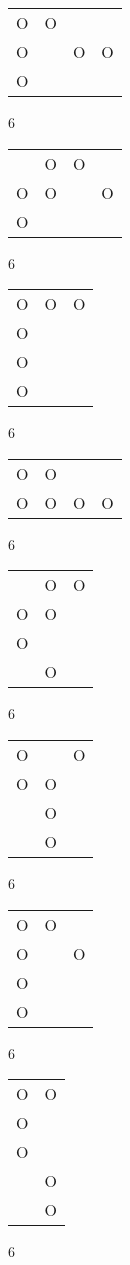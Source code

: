 \begin{tabular}{|m{0.2cm}m{0.2cm}m{0.2cm}m{0.2cm}|}\hline
O&O& & \\
O& &O&O\\
O& & & \\
\hline\end{tabular}6
\begin{tabular}{|m{0.2cm}m{0.2cm}m{0.2cm}m{0.2cm}|}\hline
 &O&O& \\
O&O& &O\\
O& & & \\
\hline\end{tabular}6
\begin{tabular}{|m{0.2cm}m{0.2cm}m{0.2cm}|}\hline
O&O&O\\
O& & \\
O& & \\
O& & \\
\hline\end{tabular}6
\begin{tabular}{|m{0.2cm}m{0.2cm}m{0.2cm}m{0.2cm}|}\hline
O&O& & \\
O&O&O&O\\
\hline\end{tabular}6
\begin{tabular}{|m{0.2cm}m{0.2cm}m{0.2cm}|}\hline
 &O&O\\
O&O& \\
O& & \\
 &O& \\
\hline\end{tabular}6
\begin{tabular}{|m{0.2cm}m{0.2cm}m{0.2cm}|}\hline
O& &O\\
O&O& \\
 &O& \\
 &O& \\
\hline\end{tabular}6
\begin{tabular}{|m{0.2cm}m{0.2cm}m{0.2cm}|}\hline
O&O& \\
O& &O\\
O& & \\
O& & \\
\hline\end{tabular}6
\begin{tabular}{|m{0.2cm}m{0.2cm}|}\hline
O&O\\
O& \\
O& \\
 &O\\
 &O\\
\hline\end{tabular}6
